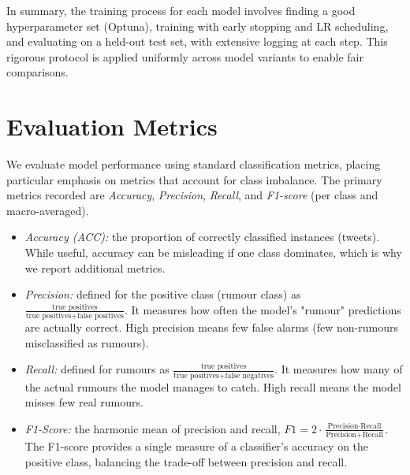 \documentclass{cshonours}
\begin{document}
In summary, the training process for each model involves finding a good hyperparameter set (Optuna), training with early stopping and LR scheduling, and evaluating on a held-out test set, with extensive logging at each step. This rigorous protocol is applied uniformly across model variants to enable fair comparisons.

\section{Evaluation Metrics}

We evaluate model performance using standard classification metrics, placing particular emphasis on metrics that account for class imbalance. The primary metrics recorded are \emph{Accuracy}, \emph{Precision}, \emph{Recall}, and \emph{F1-score} (per class and macro-averaged).

\begin{itemize}
\item \emph{Accuracy (ACC):} the proportion of correctly classified instances (tweets). While useful, accuracy can be misleading if one class dominates, which is why we report additional metrics.

\item \emph{Precision:} defined for the positive class (rumour class) as $\frac{\text{true positives}}{\text{true positives} + \text{false positives}}$. It measures how often the model's "rumour" predictions are actually correct. High precision means few false alarms (few non-rumours misclassified as rumours).

\item \emph{Recall:} defined for rumours as $\frac{\text{true positives}}{\text{true positives} + \text{false negatives}}$. It measures how many of the actual rumours the model manages to catch. High recall means the model misses few real rumours.

\item \emph{F1-Score:} the harmonic mean of precision and recall, $F1 = 2 \cdot \frac{\text{Precision} \cdot \text{Recall}}{\text{Precision} + \text{Recall}}$. The F1-score provides a single measure of a classifier's accuracy on the positive class, balancing the trade-off between precision and recall.
\end{itemize}
\end{document}
